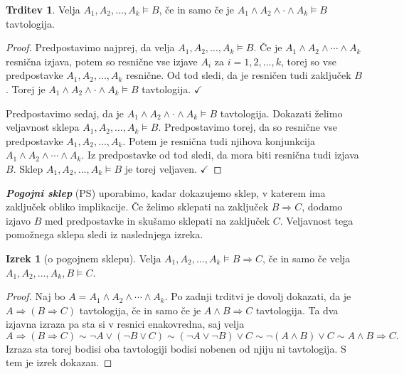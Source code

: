 \documentclass[11pt]{book}
\def\definicija{\color{rdeca}\bf\em}
\def\kljuka{$\checkmark$}
\theoremstyle{definition}
\theoremstyle{zgled}
\theoremstyle{odprtproblem}
\theoremstyle{domacanaloga}
\newenvironment{dokaz}
    {\color{siva}\begin{proof}}
    {\end{proof}}
\theoremstyle{izrek}
\newtheorem*{izrek}{Izrek}
\newtheorem*{trditev}{Trditev}
\begin{document}
\begin{trditev}
Velja $A_1, A_2, \dots, A_k \models B$, če in samo če je $A_1 \land A_2 \land \cdot \land A_k \models B$ tavtologija.
\end{trditev}
\begin{dokaz}
Predpostavimo najprej, da velja $A_1, A_2, \dots, A_k \models B$. Če je $A_1 \land A_2 \land \cdots \land A_k$ resnična izjava, potem so resnične vse izjave $A_i$ za $i = 1,2, \dots, k$, torej so vse predpostavke $A_1, A_2, \dots, A_k$ resnične. Od tod sledi, da je resničen tudi zaključek $B$. Torej je $A_1 \land A_2 \land \cdot \land A_k \models B$ tavtologija. \kljuka

Predpostavimo sedaj, da je $A_1 \land A_2 \land \cdot \land A_k \models B$ tavtologija. Dokazati želimo veljavnost sklepa $A_1, A_2, \dots, A_k \models B$. Predpostavimo torej, da so resnične vse predpostavke $A_1, A_2, \dots, A_k$. Potem je resnična tudi njihova konjunkcija $A_1 \land A_2 \land \cdots \land A_k$. Iz predpostavke od tod sledi, da mora biti resnična tudi izjava $B$. Sklep $A_1, A_2, \dots, A_k \models B$ je torej veljaven. \kljuka
\end{dokaz}

{\definicija Pogojni sklep} (PS) uporabimo, kadar dokazujemo sklep, v katerem ima zaključek obliko implikacije. Če želimo sklepati na zaključek $B \Rightarrow C$, dodamo izjavo $B$ med predpostavke in skušamo sklepati na zaključek $C$. Veljavnost tega pomožnega sklepa sledi iz naslednjega izreka.

\begin{izrek}[o pogojnem sklepu]
Velja $A_1, A_2, \dots, A_k \models B \Rightarrow C$, če in samo če velja $A_1, A_2, \dots, A_k, B \models C$.
\end{izrek}
\begin{dokaz}
Naj bo $A = A_1 \land A_2 \land \cdots \land A_k$. Po zadnji trditvi je dovolj dokazati, da je $A \Rightarrow (B \Rightarrow C)$ tavtologija, če in samo če je $A \land B \Rightarrow C$ tavtologija. Ta dva izjavna izraza pa sta si v resnici enakovredna, saj velja
\[
    A \Rightarrow (B \Rightarrow C) \sim \lnot A \lor (\lnot B \lor C) \sim (\lnot A \lor \lnot B) \lor C \sim \lnot (A \land B) \lor C \sim A \land B \Rightarrow C.
\]
Izraza sta torej bodisi oba tavtologiji bodisi nobenen od njiju ni tavtologija. S tem je izrek dokazan.
\end{dokaz}
\end{document}
